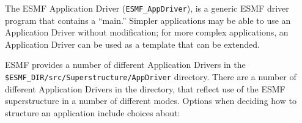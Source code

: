 %


The ESMF Application Driver ({\tt ESMF\_AppDriver}), is a generic ESMF 
driver program that contains a ``main.''  Simpler applications may be
able to use an Application Driver without modification; for more
complex applications, an Application Driver can be used as a template
that can be extended.

ESMF provides a number of different Application Drivers in the 
{\tt \$ESMF\_DIR/src/Superstructure/AppDriver} directory.  
There are a number of different Application Drivers in the directory,
that reflect use of the ESMF superstructure in a number of different
modes.  Options when deciding how to structure an application 
include choices about:

